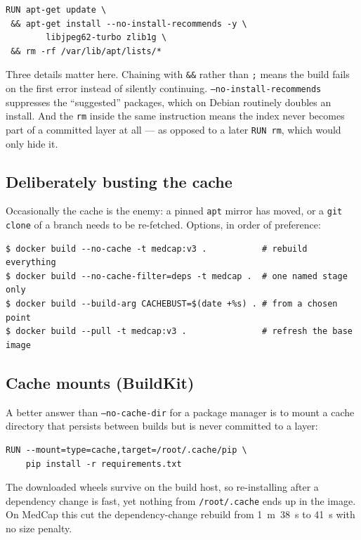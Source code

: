 \documentclass[10pt,a4paper]{article}
\newcommand{\cmd}[1]{\texttt{\small #1}}
\begin{document}
\begin{lstlisting}[style=dfile]
RUN apt-get update \
 && apt-get install --no-install-recommends -y \
        libjpeg62-turbo zlib1g \
 && rm -rf /var/lib/apt/lists/*
\end{lstlisting}

Three details matter here. Chaining with \texttt{\&\&} rather than
\texttt{;} means the build fails on the first error instead of silently
continuing. \texttt{--no-install-recommends} suppresses the
``suggested'' packages, which on Debian routinely doubles an install.
And the \cmd{rm} inside the same instruction means the index never
becomes part of a committed layer at all --- as opposed to a later
\texttt{RUN rm}, which would only hide it.

\subsection{Deliberately busting the cache}

Occasionally the cache is the enemy: a pinned \cmd{apt} mirror has moved,
or a \cmd{git clone} of a branch needs to be re-fetched. Options, in
order of preference:

\begin{lstlisting}[style=shell]
$ docker build --no-cache -t medcap:v3 .           # rebuild everything
$ docker build --no-cache-filter=deps -t medcap .  # one named stage only
$ docker build --build-arg CACHEBUST=$(date +%s) . # from a chosen point
$ docker build --pull -t medcap:v3 .               # refresh the base image
\end{lstlisting}

\subsection{Cache mounts (BuildKit)}

A better answer than \texttt{--no-cache-dir} for a package manager is to
mount a cache directory that persists between builds but is never
committed to a layer:

\begin{lstlisting}[style=dfile]
RUN --mount=type=cache,target=/root/.cache/pip \
    pip install -r requirements.txt
\end{lstlisting}

The downloaded wheels survive on the build host, so re-installing after
a dependency change is fast, yet nothing from \texttt{/root/.cache} ends
up in the image. On MedCap this cut the dependency-change rebuild from
1~m~38~s to 41~s with no size penalty.
\end{document}
